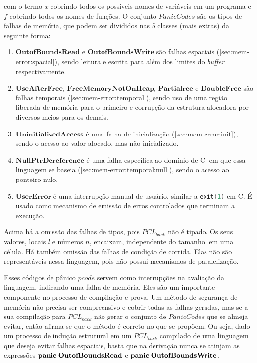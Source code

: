 \noindent com o termo $x$ cobrindo todos os possíveis nomes de variáveis em um programa e $f$ cobrindo todos os nomes de funções. O conjunto $PanicCodes$ são os tipos de falhas de memória, que podem ser divididos nas 5 classes (mais extras) da seguinte forma:
\begin{enumerate}
	\item $\mathbf{OutofBoundsRead}$ e $\mathbf{OutofBoundsWrite}$ são falhas espaciais (\ref{sec:mem-error:spacial}), sendo leitura e escrita para além dos limites do \emph{buffer} respectivamente.
	\item $\mathbf{UseAfterFree}$, $\mathbf{FreeMemoryNotOnHeap}$, $\mathbf{Partial ree}$ e $\mathbf{Double Free}$ são falhas temporais (\ref{sec:mem-error:temporal}), sendo uso de uma região liberada de memória para o primeiro e corrupção da estrutura alocadora por diversos meios para os demais.
	\item $\mathbf{UninitializedAccess}$ é uma falha de inicialização (\ref{sec:mem-error:init}), sendo o acesso ao valor alocado, mas não inicializado. 
	\item $\mathbf{NullPtrDereference}$ é uma falha específica ao domínio de C, em que essa linguagem se baseia (\ref{sec:mem-error:temporal:null}), sendo o acesso ao ponteiro nulo.
	\item $\mathbf{UserError}$ é uma interrupção manual de usuário, similar a \lstinline[language=C]|exit(1)| em C. É usado como mecanismo de emissão de erros controlados que terminam a execução.
\end{enumerate}

\noindent Acima há a omissão das falhas de tipos, pois $PCL_{back}$ não é tipado. Os seus valores, locais $l$ e números $n$, encaixam, independente do tamanho, em uma célula. Há também omissão das falhas de condição de corrida. Elas não são representáveis nessa linguagem, pois não possui mecanismos de paralelização.

Esses códigos de pânico $pcode$ servem como interrupções na avaliação da linguagem, indicando uma falha de memória. Eles são um importante componente no processo de compilação e prova. Um método de segurança de memória não precisa ser compreensivo e cobrir todas as falhas geradas, mas se a sua compilação para $PCL_{back}$ não gerar o conjunto de $PanicCodes$ que se almeja evitar, então afirma-se que o método é correto no que se propõem. Ou seja, dado um processo de indução estrutural em um $PCL_{back}$ compilado de uma linguagem que deseja evitar falhas espaciais, basta que na derivação nunca se atinjam as expressões $\mathbf{panic}\;\mathbf{OutofBoundsRead}$ e $\mathbf{panic}\;\mathbf{OutofBoundsWrite}$.

